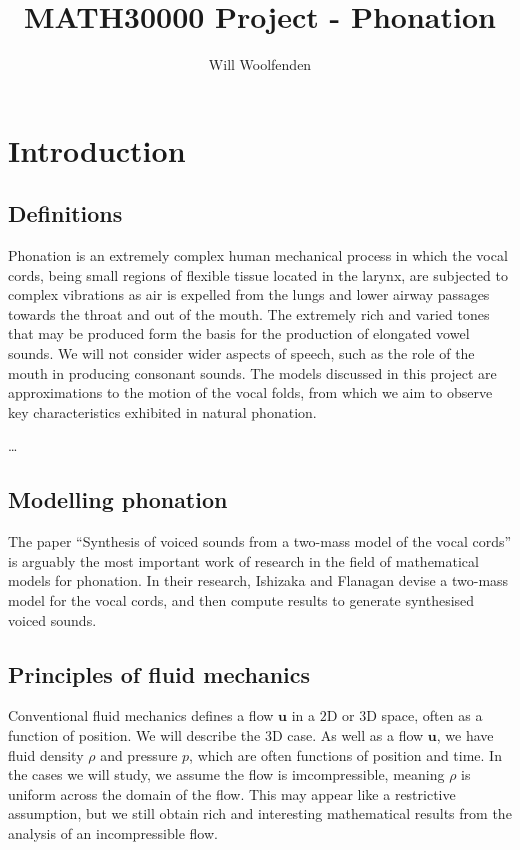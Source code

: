 \documentclass{book}
\title{MATH30000 Project - Phonation}
\author{Will Woolfenden}
\begin{document}
\maketitle

\chapter{Introduction}

\section{Definitions}

Phonation is an extremely complex human mechanical process in which the vocal cords, being small regions of flexible tissue located in the larynx,
are subjected to complex vibrations as air is expelled from the lungs and lower airway passages towards the throat and out of the mouth.
The extremely rich and varied tones that may be produced  form the basis for the production of elongated vowel sounds.
We will not consider wider aspects of speech, such as the role of the mouth in producing consonant sounds.
The models discussed in this project are approximations to the motion of the vocal folds,
from which we aim to observe key characteristics exhibited in natural phonation.


\dots

\section{Modelling phonation}

The paper ``Synthesis of voiced sounds from a two-mass model of the vocal cords'' \cite{ishizaka_flanagan_1972} is arguably the most important work of research in the field of mathematical models for phonation.
In their research, Ishizaka and Flanagan devise a two-mass model for the vocal cords, and then compute results to generate synthesised voiced sounds.

\section{Principles of fluid mechanics}

Conventional fluid mechanics defines a flow $\mathbf{u}$ in a $2$D or $3$D space,
often as a function of position.
We will describe the $3$D case.
As well as a flow $\mathbf{u}$,
we have fluid density $\rho$ and pressure $p$,
which are often functions of position and time.
In the cases we will study,
we assume the flow is imcompressible,
meaning $\rho$ is uniform across the domain of the flow.
This may appear like a restrictive assumption,
but we still obtain rich and interesting mathematical results from the analysis of an incompressible flow.
\end{document}
